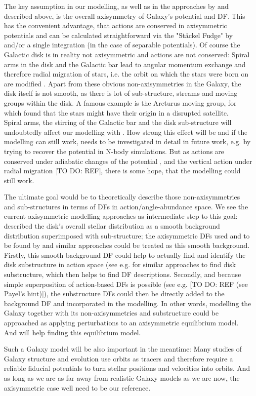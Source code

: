 The key assumption in our modelling, as well as in the approaches by \citet{pif14} and \citet{san15} described above, is the overall axisymmetry of Galaxy's potential and DF. This has the convenient advantage, that actions are conserved in axisymmetric potentials and can be calculated straightforward via the "St\"{a}ckel Fudge" by \citet{bin12} and/or a single integration (in the case of separable potentials). Of course the Galactic disk is in reality not axisymmetric and actions are not conserved: Spiral arms in the disk and the Galactic bar lead to angular momentum exchange and therefore radial migration of stars, i.e. the orbit on which the stars were born on are modified \citep{2011A&A...527A.147M,2014MNRAS.443.2757K}. Apart from these obvious non-axisymmetries in the Galaxy, the disk itself is not smooth, as there is lot of sub-structure, streams and moving groups within the disk. A famous example is the Arcturus moving group, for which \citet{2004ApJ...601L..43N} found that the stars might have their origin in a disrupted satellite.
\\Spiral arms, the stirring of the Galactic bar and the disk sub-structure will undoubtedly affect our modelling with \RM. How strong this effect will be and if the modelling can still work, needs to be investigated in detail in future work, e.g. by trying to recover the potential in N-body simulations. But as actions are conserved under adiabatic changes of the potential \citet{bin08}, and the vertical action under radial migration [TO DO: REF], there is some hope, that the modelling could still work.

The ultimate goal would be to theoretically describe those non-axisymmetries and sub-structures in terms of DFs in action/angle-abundance space. We see the current axisymmetric modelling approaches as intermediate step to this goal: \citet{1998AJ....115.2384D} described the disk's overall stellar distribution as a smooth background distribution superimposed with sub-structure; the axisymmetric DFs used and to be found by \RM and similar approaches could be treated as this smooth background. Firstly, this smooth background DF could help to actually find and identify the disk substructure in action space (see e.g. \citet{2010MNRAS.409..145S,2008ApJ...685..261K} for similar approaches to find disk substructure, which then helps to find DF descriptions. Secondly, and because simple superposition of action-based DFs is possible (see e.g. [TO DO: REF (see Payel's hint)]), the substructure DFs could then be directly added to the background DF and incorporated in the modelling. In other words, modelling the Galaxy together with its non-axisymmetries and substructure could be approached as applying perturbations to an axisymmetric equilibrium model. And \RM will help finding this equilibrium model.

Such a Galaxy model will be also important in the meantime: Many studies of Galaxy structure and evolution use orbits as tracers and therefore require a reliable fiducial potentials to turn stellar positions and velocities into orbits. And as long as we are as far away from realistic Galaxy models as we are now, the axisymmetric case well need to be our reference.